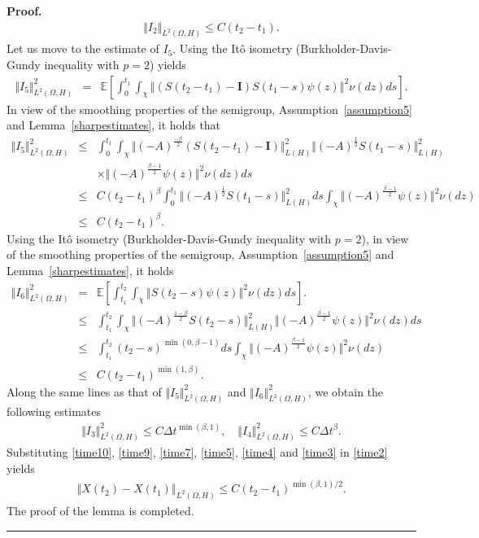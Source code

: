 \documentclass[review,12pt]{elsarticle}
\newenvironment{proof}[1][Proof]{\textbf{#1.} }{\hspace{\stretch{1}}\rule{0.5em}{0.5em}}
\newcommand{\lemref}[1]{{Lemma~\ref{#1}}}
\newcommand{\assref}[1]{{Assumption~\ref{#1}}}
\begin{document}
\begin{proof}
\begin{eqnarray}
\label{time5}
\Vert I_2\Vert_{L^2(\Omega, H)}\leq C(t_2-t_1).
\end{eqnarray}
Let us move to the estimate of $I_5$.
Using the It\^{o} isometry  (Burkholder-Davis-Gundy inequality with $p=2$)   yields
\begin{eqnarray}
\label{time8}
\Vert I_5\Vert^2_{L^2(\Omega, H)}&=& \mathbb{E}\left[\int_0^{t_1}\int_{\chi}\left\Vert \left(S(t_2-t_1)-\mathbf{I}\right)S(t_1-s)\psi(z)\right\Vert^2\nu(dz)ds\right].
\end{eqnarray}
In view of the smoothing properties of the semigroup, \assref{assumption5} and   \lemref{sharpestimates}, it holds that
\begin{eqnarray}
\label{time9}
\Vert I_5\Vert^2_{L^2(\Omega, H)}&\leq& \int_0^{t_1}\int_{\chi}\Vert(-A)^{\frac{-\beta}{2}}(S(t_2-t_1)-\mathbf{I})\Vert^2_{L(H)}\Vert (-A)^{\frac{1}{2}} S(t_1-s)\Vert^2_{L(H)}\nonumber\\
&&\times\Vert(-A)^{\frac{\beta-1}{2}}\psi(z)\Vert^2\nu(dz)ds\nonumber\\
&\leq& C(t_2-t_1)^{\beta}\int_0^{t_1}\Vert (-A)^{\frac{1}{2}} S(t_1-s)\Vert^2_{L(H)}ds\int_{\chi}\Vert(-A)^{\frac{\beta-1}{2}}\psi(z)\Vert^2\nu(dz)\nonumber\\
&\leq& C(t_2-t_1)^{\beta}.
\end{eqnarray}
Using the It\^{o} isometry  (Burkholder-Davis-Gundy inequality with $p=2$), in view of the smoothing properties of the semigroup, \assref{assumption5} and   \lemref{sharpestimates}, it holds 
\begin{eqnarray}
\label{time10}
\Vert I_6\Vert^2_{L^2(\Omega, H)}&=& \mathbb{E}\left[\int_{t_1}^{t_2}\int_{\chi}\left\Vert S(t_2-s)\psi(z)\right\Vert^2\nu(dz)ds\right].
\nonumber\\
&\leq& \int^{t_2}_{t_1}\int_{\chi}\Vert (-A)^{\frac{1-\beta}{2}} S(t_2-s)\Vert^2_{L(H)}\Vert(-A)^{\frac{\beta-1}{2}}\psi(z)\Vert^2\nu(dz)ds\nonumber\\
&\leq& \int^{t_2}_{t_1}(t_2-s)^{\min(0,\beta-1)}ds\int_{\chi}\Vert(-A)^{\frac{\beta-1}{2}}\psi(z)\Vert^2\nu(dz)\nonumber\\
&\leq& C(t_2-t_1)^{\min(1,\beta)}.
\end{eqnarray}
Along the same lines as that of $\Vert I_5\Vert^2_{L^2(\Omega,H)}$ and $\Vert I_6\Vert^2_{L^2(\Omega,H)}$, we obtain the following estimates
\begin{eqnarray}
\label{time7}
\Vert I_3\Vert^2_{L^2(\Omega, H)}\leq C\Delta t^{\min(\beta,1)},\quad \Vert I_4\Vert^2_{L^2(\Omega,H)}\leq C\Delta t^{\beta}.
\end{eqnarray}
Substituting \eqref{time10}, \eqref{time9}, \eqref{time7}, \eqref{time5}, \eqref{time4} and \eqref{time3} in \eqref{time2} yields
\begin{eqnarray}
\left\Vert X(t_2)-X(t_1)\right\Vert_{L^2(\Omega, H)}\leq C(t_2-t_1)^{\min(\beta, 1)/2}.
\end{eqnarray}
The proof of the lemma is completed. 
 \end{proof}
\end{document}
